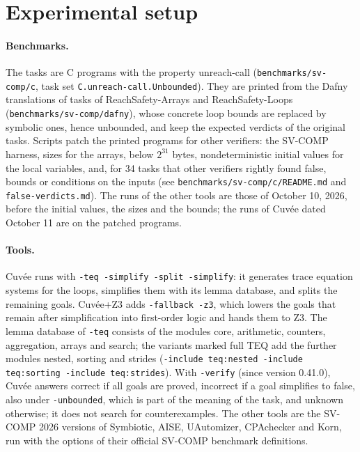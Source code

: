 
\section*{Experimental setup}

\paragraph{Benchmarks.}
The \UnboundedTasks{} tasks are C programs with the property unreach-call
(\texttt{benchmarks/sv-comp/c}, task set \texttt{C.unreach-call.Unbounded}). They are printed from the
Dafny translations of tasks of ReachSafety-Arrays and ReachSafety-Loops
(\texttt{benchmarks/sv-comp/dafny}), whose concrete loop bounds are replaced by symbolic ones, hence
unbounded, and keep the expected verdicts of the original tasks. Scripts patch the printed programs for
other verifiers: the SV-COMP harness, sizes for the arrays, below $2^{31}$ bytes, nondeterministic initial
values for the local variables, and, for 34 tasks that other verifiers rightly found false, bounds or
conditions on the inputs (see \texttt{benchmarks/sv-comp/c/README.md} and \texttt{false-verdicts.md}).
The runs of the other tools are those of October 10, 2026, before the initial values, the sizes and the
bounds; the runs of Cuvée dated October 11 are on the patched programs.

\paragraph{Tools.}
Cuvée runs with \texttt{-teq -simplify -split -simplify}: it generates trace equation systems for
the loops, simplifies them with its lemma database, and splits the remaining goals. Cuvée+Z3 adds
\texttt{-fallback -z3}, which lowers the goals that remain after simplification into first-order logic
and hands them to Z3. The lemma database of \texttt{-teq} consists of the modules core, arithmetic,
counters, aggregation, arrays and search; the variants marked full TEQ add the further modules nested,
sorting and strides (\texttt{-include teq:nested -include teq:sorting -include teq:strides}). With
\texttt{-verify} (since version 0.41.0), Cuvée answers correct if all goals are proved, incorrect if a goal
simplifies to false, also under \texttt{-unbounded}, which is part of the meaning of the task, and unknown
otherwise; it does not search for counterexamples. The other tools are the
SV-COMP 2026 versions of Symbiotic, AISE, UAutomizer, CPAchecker and Korn, run with the options of their
official SV-COMP benchmark definitions.

